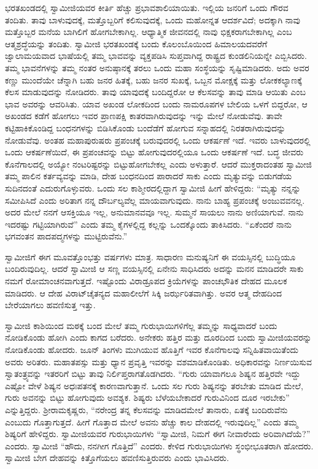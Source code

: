  ಭರತಖಂಡದಲ್ಲಿ ಸ್ವಾಮೀಜಿಯವರ ಕೀರ್ತಿ ಹೆಚ್ಚು ಪ್ರಭಾವಶಾಲಿಯಾಯಿತು. ಇಲ್ಲಿಯ ಜನರಿಗೆ ಒಂದು ಗೌರವ ತಂದಿತು. ತಾವು ಬಾಳುವುದಕ್ಕೆ, ಮತ್ತೊಬ್ಬರಿಗೆ ಕಲಿಸುವುದಕ್ಕೆ, ಒಂದು ಮಹೋನ್ನತ ಆದರ್ಶವಿದೆ; ಅದಕ್ಕಾಗಿ ನಾವು ಮತ್ತೊಬ್ಬರ ಮನೆಯ ಬಾಗಿಲಿಗೆ ಹೋಗಬೇಕಾಗಿಲ್ಲ. ಆಧ್ಯಾತ್ಮಿಕ ಜೀವನದಲ್ಲಿ ನಾವು ಭಿಕ್ಷಕರಾಗಬೇಕಾಗಿಲ್ಲ ಎಂಬ ಆತ್ಮಶ್ರದ್ಧೆಯನ್ನು ತಂದಿತು. ಸ್ವಾಮೀಜಿ ಭರತಖಂಡಕ್ಕೆ ಬಂದು ಕೊಲಂಬೊಯಿಂದ ಹಿಮಾಲಯದವರೆಗೆ ಜ್ವಾಲಾಮಯವಾದ ಭಾಷೆಯಲ್ಲಿ ತಮ್ಮ ಭಾವವನ್ನು ವ್ಯಕ್ತಪಡಿಸಿ ಸುಪ್ತವಾಗಿದ್ದ ರಾಷ್ಟ್ರದ ಕುಂಡಲಿನಿಯನ್ನೇ ಎಬ್ಬಿಸಿದರು. ತಮ್ಮ ಭಾವನೆಗಳನ್ನು ತಮ್ಮ ನಂತರ ಅನುಷ್ಠಾನಕ್ಕೆ ತರಲು ಒಂದು ಮಹಾ ಸಂಸ್ಥೆಯನ್ನು ಸೃಷ್ಟಿಮಾಡಿದರು. ಅದು ಅವರ ಕಣ್ಣು ಮುಂದೆಯೇ ಚೆನ್ನಾಗಿ ಬಹು ಜನರ ಹಿತಕ್ಕೆ, ಬಹು ಜನರ ಸುಖಕ್ಕೆ, ಒಬ್ಬನ ಮೋಕ್ಷಕ್ಕೆ ಮತ್ತು ಲೋಕಕಲ್ಯಾಣಕ್ಕೆ ಕೆಲಸ ಮಾಡುವುದನ್ನು ನೋಡಿದರು. ತಾವು ಯಾವುದಕ್ಕೆ ಬಂದಿದ್ದರೋ ಆ ಕೆಲಸವನ್ನು ತಾವು ಮಾಡಿ ಆಯಿತು ಎಂಬ ಭಾವ ಅವರನ್ನು ಆವರಿಸಿತು. ಯಾವ ಅಖಂಡ ಲೋಕದಿಂದ ಬಂದು ನಾಮರೂಪಗಳ ಬೇಲಿಯ ಒಳಗೆ ಬಿದ್ದರೋ, ಆ ಅಖಂಡದ ಕಡೆಗೆ ಹೋಗಲು ಇವರ ಪ್ರಾಣಪಕ್ಷಿ ಕಾತರವಾಗಿರುವುದನ್ನು ಇನ್ನು ಮೇಲೆ ನೋಡುವೆವು. ತಾವೇ ಕಟ್ಟಿಹಾಕಿಕೊಂಡಿದ್ದ ಬಂಧನಗಳನ್ನು ಬಿಡಿಸಿಕೊಂಡು ಬಂದೆಡೆಗೆ ಹೋಗುವ ಸನ್ನಾಹದಲ್ಲಿ ನಿರತರಾಗಿರುವುದನ್ನು ನೋಡುವೆವು. ಅಂತಹ ಮಹಾಪುರುಷರು ಪ್ರಪಂಚಕ್ಕೆ ಬರುವುದರಲ್ಲಿ ಒಂದು ಆಕರ್ಷಣೆ ಇದೆ. ಇವರು ಬಾಳುವುದರಲ್ಲಿ ಒಂದು ಆಕರ್ಷಣೆಯಿದೆ, ಈ ಪ್ರಪಂಚವನ್ನು ಬಿಟ್ಟು ಹೋಗುವುದರಲ್ಲಿಯೂ ಒಂದು ಆಕರ್ಷಣೆ ಇದೆ. ಬದ್ಧ ಜೀವರು ಕೊನೆಗಾಲದಲ್ಲಿ ಅಯ್ಯೋ ನಂಟರಿಷ್ಟರನ್ನು ಬಿಟ್ಟುಹೋಗಬೇಕಲ್ಲ ಎಂದು ಅಳುತ್ತಾರೆ. ಆದರೆ ಮುಕ್ತರಾದಂತಹ ಸ್ವಾಮೀಜಿ ತಮ್ಮ ಪಾಲಿನ ಕರ್ತವ್ಯವನ್ನು ಮಾಡಿ, ದೇಹ ಬಂಧನದಿಂದ ಪಾರಾದರೆ ಸಾಕು ಎಂದು ಮೃತ್ಯುವನ್ನು ಬಿಡುಗಡೆಯ ಸುದಿನದಂತೆ ಎದುರುಗೊಳ್ಳುವರು. ಒಂದು ಸಲ ಕಾಶ್ಮೀರದಲ್ಲಿದ್ದಾಗ ಸ್ವಾಮೀಜಿ ಹೀಗೆ ಹೇಳಿದ್ದರು: “ಮೃತ್ಯು ನನ್ನನ್ನು ಸಮೀಪಿಸಿದೆ ಎಂದು ಅರಿತಾಗ ನನ್ನ ದೌರ್ಬಲ್ಯವೆಲ್ಲ ಮಾಯವಾಗುವುದು. ನಾನು ಬಾಹ್ಯ ಪ್ರಪಂಚಕ್ಕೆ ಅಂಜುವವನಲ್ಲ. ಅದರ ಮೇಲೆ ನನಗೆ ಆಸಕ್ತಿಯೂ ಇಲ್ಲ, ಅನುಮಾನವವೂ ಇಲ್ಲ. ಸುಮ್ಮನೆ ಸಾಯಲು ನಾನು ಅಣಿಯಾಗುವೆ. ನಾನು ಇದರಷ್ಟು ಗಟ್ಟಿಯಾಗಿರುವೆ” ಎಂದು ತಮ್ಮ ಕೈಗಳಲ್ಲಿದ್ದ ಕಲ್ಲನ್ನು ಒಂದಕ್ಕೊಂದು ತಾಕಿಸಿದರು. “ಏಕೆಂದರೆ ನಾನು ಭಗವಂತನ ಪಾದಪದ್ಮಗಳನ್ನು ಮುಟ್ಟಿರುವೆನು.” 

 ಸ್ವಾಮೀಜಿಗೆ ಈಗ ಮೂವತ್ತೊಂಭತ್ತು ವರ್ಷಗಳು ಮಾತ್ರ. ಸಾಧಾರಣ ಮನುಷ್ಯನಿಗೆ ಈ ವಯಸ್ಸಿನಲ್ಲಿ ಬುದ್ಧಿಯೂ ಬಂದಿರುವುದಿಲ್ಲ. ಆದರೆ ಸ್ವಾಮೀಜಿ ಆ ಸಣ್ಣ ವಯಸ್ಸಿನಲ್ಲಿ ಏನೇನು ಸಾಧಿಸಿದರು ಅದನ್ನು ಮನನ ಮಾಡಿದರೇ ಸಾಕು ನಮಗೆ ರೋಮಾಂಚನವಾಗುತ್ತದೆ. ಇಷ್ಟೊಂದು ವಿರಾಡ್ರೂಪದ ಕ್ರಿಯೆಗಳನ್ನು ಪಾಂಚಭೌತಿಕ ದೇಹದ ಮೂಲಕ ಮಾಡಿದರು. ಆ ದೇಹ ವಿರಾಟ್‌ಚೈತನ್ಯದ ಮಹಾಲೀಲೆಗೆ ಸಿಕ್ಕಿ ಜರ್ಝರಿತವಾಗಿತ್ತು. ಅವರ ಆತ್ಮ ದೇಹದಿಂದ ಬೇರೆಯಾಗಲು ಹವಣಿಸುತ್ತ ಇತ್ತು. 

 ಸ್ವಾಮೀಜಿ ಕಾಶಿಯಿಂದ ಮಠಕ್ಕೆ ಬಂದ ಮೇಲೆ ತಮ್ಮ ಗುರುಭಾಯಿಗಳಿಗೆಲ್ಲ ತಮ್ಮನ್ನು ಸಾಧ್ಯವಾದರೆ ಬಂದು ನೋಡಿಕೊಂಡು ಹೋಗಿ ಎಂದು ಕಾಗದ ಬರೆದರು. ಅನೇಕರು ಹತ್ತಿರ ಮತ್ತು ದೂರದಿಂದ ಬಂದು ಸ್ವಾಮೀಜಿಯವರನ್ನು ನೋಡಿಕೊಂಡು ಹೋದರು. ಜೂನ್ ತಿಂಗಳು ಮುಗಿಯುವ ಹೊತ್ತಿಗೆ ಇವರ ಕೊನೆಗಾಲವು ಸನ್ನಿಹಿತವಾಯಿತೆಂದು ಅವರು ಅರಿತರು. ಮಹಾತಪಸ್ಸು ಮತ್ತು ಧ್ಯಾನ ಪ್ರವೃತ್ತಿ ಇವರನ್ನು ವಶಮಾಡಿಕೊಂಡಿತು. ಅಧಿಕಾರವನ್ನು ನಿರ್ಣಯಿಸುವ ಸ್ವಾತಂತ್ರ್ಯವನ್ನು ಇತರರಿಗೆ ಬಿಟ್ಟು ತಾವು ನಿರ್ಲಿಪ್ತರಾಗತೊಡಗಿದರು. “ಗುರು ಯಾವಾಗಲೂ ಶಿಷ್ಯನ ಹತ್ತಿರವೇ ಇದ್ದು ಎಷ್ಟೋ ವೇಳೆ ಶಿಷ್ಯನ ಅಧಃಪತನಕ್ಕೆ ಕಾರಣವಾಗುತ್ತಾನೆ. ಒಂದು ಸಲ ಗುರು ಶಿಷ್ಯನನ್ನು ತರಬೇತು ಮಾಡಿದ ಮೇಲೆ, ಗುರು ಅವನನ್ನು ಬಿಟ್ಟು ಹೋಗುವುದು ಅವಶ್ಯಕ. ಶಿಷ್ಯರು ಬೆಳೆಯಬೇಕಾದರೆ ಗುರುವಿನಿಂದ ದೂರ ಇರಬೇಕು” ಎನ್ನುತ್ತಿದ್ದರು. ಶ‍್ರೀರಾಮಕೃಷ್ಣರು, “ನರೇಂದ್ರ ತನ್ನ ಕೆಲಸವನ್ನು ಮಾಡಿದಮೇಲೆ ತಾನಾರು, ಏತಕ್ಕೆ ಬಂದಿರುವೆನು ಎಂಬುದು ಗೊತ್ತಾಗುತ್ತದೆ. ಹೀಗೆ ಗೊತ್ತಾದ ಮೇಲೆ ಅವನು ಹೆಚ್ಚು ಕಾಲ ದೇಹದಲ್ಲಿ ಇರುವುದಿಲ್ಲ” ಎಂದು ತಮ್ಮ ಶಿಷ್ಯರಿಗೆ ಹೇಳಿದ್ದರು. ಸ್ವಾಮೀಜಿಯವರ ಗುರುಭಾಯಿಗಳು “ಸ್ವಾಮೀಜಿ, ನಿಮಗೆ ಈಗ ನೀವಾರೆಂದು ಅರಿವಾಗಿದೆಯೆ?” ಎಂದರು. ಸ್ವಾಮೀಜಿ “ಹೌದು, ನನಗೀಗ ಗೊತ್ತಿದೆ” ಎಂದರು. ಕೇಳಿದ ಗುರುಭಾಯಿಗಳು ಸ್ಥಂಭೀಭೂತರಾಗಿ ಹೋದರು. ಸ್ವಾಮೀಜಿ ಬೇಗ ದೇಹವನ್ನು ಕಿತ್ತೊಗೆಯಲು ಹವಣಿಸುತ್ತಿರುವರು ಎಂದು ಭಾವಿಸಿದರು. 


